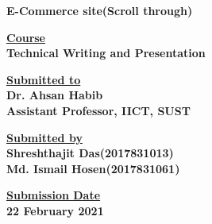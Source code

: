 \documentclass{article}
\begin{document}
\begin{titlepage}

  \centering
  {\Large \bfseries  E-Commerce site(Scroll through)}
  \vspace{6\baselineskip}
  
  
  
  
  {\Large \bfseries \underline{Course}\\ \vspace{0.5\baselineskip} Technical Writing and Presentation}
  \vspace{5\baselineskip}
  
  
  
  
  {\Large \bfseries \underline{Submitted to}\\ \vspace{0.5\baselineskip} Dr. Ahsan Habib \\ \vspace{0.4\baselineskip}
   Assistant Professor, IICT, SUST}
  \vspace{5\baselineskip}
  
 
 
  
  {\Large \bfseries \underline{Submitted by}\\ \vspace{0.5\baselineskip}Shreshthajit Das(2017831013) \\ \vspace{0.4\baselineskip}
   Md. Ismail Hosen(2017831061)}
  \vspace{5\baselineskip}
 
 

   
  {\Large \bfseries \underline{Submission Date}\\ \vspace{0.5\baselineskip}22 February 2021}
  \vspace{3\baselineskip}
 
\end{titlepage}




















\tableofcontents
\end{document}
